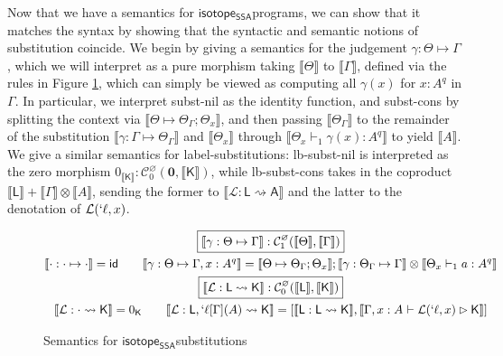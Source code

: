 \documentclass[acmsmall,screen,review]{acmart}
\newcommand{\mc}[1]{\ensuremath{\mathcal{#1}}}
\newcommand{\mb}[1]{\ensuremath{\mathbf{#1}}}
\newcommand{\ms}[1]{\ensuremath{\mathsf{#1}}}
\newcommand{\lbl}[1]{{`#1}}
\newcommand{\csplits}[3]{#1 \mapsto #2;#3}
\newcommand{\thyp}[3]{#1: {#2}^{#3}}
\newcommand{\lhyp}[3]{#1[#2](#3)}
\newcommand{\llhyp}[3]{\lhyp{\lbl{#1}}{#2}{#3}}
\newcommand{\rle}[1]{{\scriptsize\textsf{#1}}}
\newcommand{\hasty}[5]{#1 \vdash_{#2} #3: {#4}^{#5}}
\newcommand{\haslb}[3]{#1 \vdash #2 \rhd #3}
\newcommand{\issubst}[3]{#1: #2 \mapsto #3}
\newcommand{\lbsubst}[3]{#1: #2 \rightsquigarrow #3}
\newcommand{\dnt}[1]{\llbracket{#1}\rrbracket}
\newcommand{\isotopessa}{\ms{isotope_{SSA}}}
\begin{document}
Now that we have a semantics for \isotopessa programs, we can show that it
matches the syntax by showing that the syntactic and semantic notions of
substitution coincide. We begin by giving a semantics for the judgement
\(\issubst{\gamma}{\Theta}{\Gamma}\), which we will interpret as a pure morphism
taking \(\dnt{\Theta}\) to \(\dnt{\Gamma}\), defined via the rules in Figure
\ref{fig:ssa-subst-semantics}, which can simply be viewed as computing all
\(\gamma(x)\) for \(\thyp{x}{A}{q}\) in \(\Gamma\). In particular, we interpret
\rle{subst-nil} as the identity function, and \rle{subst-cons} by splitting the
context via \(\dnt{\csplits{\Theta}{\Theta_\Gamma}{\Theta_x}}\), and then
passing \(\dnt{\Theta_\Gamma}\) to the remainder of the substitution
\(\dnt{\issubst{\gamma}{\Gamma}{\Theta_\Gamma}}\) and \(\dnt{\Theta_x}\) through
\(\dnt{\hasty{\Theta_x}{1}{\gamma(x)}{A}{q}}\) to yield \(\dnt{A}\). We give a
similar semantics for label-substitutions: \rle{lb-subst-nil} is interpreted as
the zero morphism \(0_{\dnt{\ms{K}}}: \mc{C}_0^\varnothing(\mb{0},
\dnt{\ms{K}})\), while \rle{lb-subst-cons} takes in the coproduct \(\dnt{\ms{L}}
+ \dnt{\Gamma} \otimes \dnt{A}\), sending the former to
\(\dnt{\lbsubst{\mc{L}}{\ms{L}}{\ms{A}}}\) and the latter to the denotation of
\(\mc{L}(\lbl{\ell}, x)\).

\begin{figure}
  \begin{gather*}
    \boxed{\dnt{\issubst{\gamma}{\Theta}{\Gamma}}: \mc{C}_1^\varnothing(\dnt{\Theta}, \dnt{\Gamma})} 
    \\
    \dnt{\issubst{\cdot}{\cdot}{\cdot}} = \ms{id}
    \qquad
    \dnt{\issubst{\gamma}{\Theta}{\Gamma, \thyp{x}{A}{q}}}
      = \dnt{\csplits{\Theta}{\Theta_\Gamma}{\Theta_x}};\dnt{\issubst{\gamma}{\Theta_\Gamma}{\Gamma}} \otimes \dnt{\hasty{\Theta_x}{1}{a}{A}{q}}
    \\
    \boxed{\dnt{\lbsubst{\mc{L}}{\ms{L}}{\ms{K}}}: \mc{C}_0^\varnothing(\dnt{\ms{L}}, \dnt{\ms{K}})} 
    \\
    \dnt{\lbsubst{\mc{L}}{\cdot}{\ms{K}}} = 0_{\ms{K}}
    \qquad
    \dnt{\lbsubst{\mc{L}}{\ms{L}, \llhyp{\ell}{\Gamma}{A}}{\ms{K}}}
    = [\dnt{\lbsubst{\ms{L}}{\ms{L}}{\ms{K}}}, \dnt{\haslb{\Gamma, \thyp{x}{A}{}}{\mc{L}(\lbl{\ell}, x)}{\ms{K}}}]
  \end{gather*}
  \caption{Semantics for \isotopessa substitutions}
  \label{fig:ssa-subst-semantics}
\end{figure}
\end{document}
